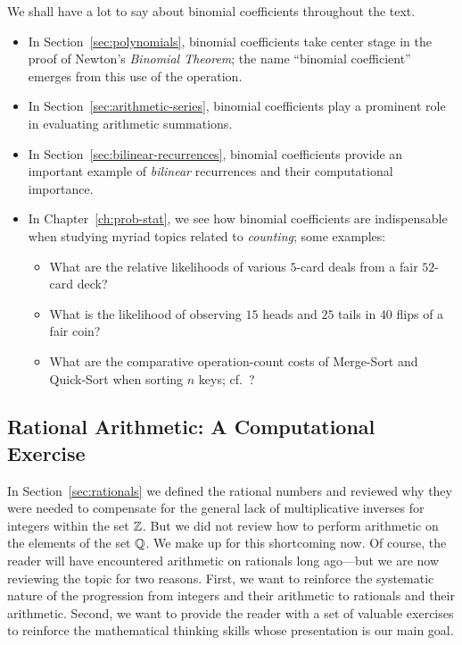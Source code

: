 We shall have a lot to say about binomial coefficients throughout the
text.
\begin{itemize}
\item
In Section~\ref{sec:polynomials}, binomial coefficients take center
stage in the proof of Newton's {\it Binomial Theorem}; the name
``binomial coefficient'' emerges from this use of the operation.
\item
In Section~\ref{sec:arithmetic-series}, binomial coefficients play a
prominent role in evaluating arithmetic summations.
\item
In Section~\ref{sec:bilinear-recurrences}, binomial coefficients
provide an important example of {\em bilinear} recurrences and their
computational importance.
\item
In Chapter~\ref{ch:prob-stat}, we see how binomial coefficients are
indispensable when studying myriad topics related to {\em counting};
some examples:
  \begin{itemize}
  \item
What are the relative likelihoods of various $5$-card deals from a
fair $52$-card deck?
  \item
What is the likelihood of observing $15$ {\sc head}s and $25$ {\sc
  tail}s in $40$ flips of a fair coin?
  \item
What are the comparative operation-count costs of Merge-Sort and
Quick-Sort when sorting $n$ keys; cf.~\cite{CLRS}?
  \end{itemize}
\end{itemize}


\subsection{Rational Arithmetic: A Computational Exercise}
\label{sec:Rational-arithmetic}

In Section~\ref{sec:rationals} we defined the rational numbers and
reviewed why they were needed to compensate for the general lack of
multiplicative inverses for integers within the set $\mathbb{Z}$.  But we did
not review how to perform arithmetic on the elements of the set $\mathbb{Q}$.
We make up for this shortcoming now.  Of course, the reader will have
encountered arithmetic on rationals long ago---but we are now
reviewing the topic for two reasons.  First, we want to reinforce the
systematic nature of the progression from integers and their
arithmetic to rationals and their arithmetic.  Second, we want to
provide the reader with a set of valuable exercises to reinforce the
mathematical thinking skills whose presentation is our main goal.

